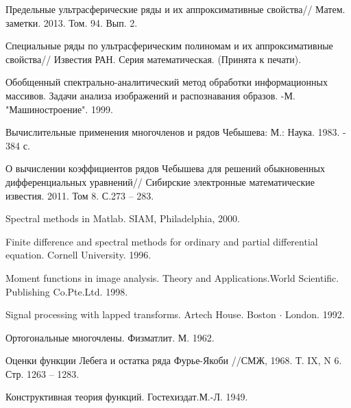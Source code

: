 \begin{thebibliography}{1} %




Предельные ультрасферические ряды и их аппроксимативные свойства// Матем. заметки. 2013. Том. 94. Вып. 2.

Специальные  ряды по ультрасферическим полиномам и их аппроксимативные свойства// Известия РАН. Серия математическая. (Принята к печати).

Обобщенный спектрально-аналитический метод обработки информационных массивов. Задачи анализа изображений и распознавания образов. -М. "Машиностроение". 1999.

Вычислительные применения многочленов и рядов Чебышева:  М.: Наука. 1983. - 384 с.

О вычислении коэффициентов рядов Чебышева для решений обыкновенных дифференциальных уравнений// Сибирские электронные  математические известия. 2011. Том 8. С.273 -- 283.

Spectral methods in Matlab. SIAM, Philadelphia, 2000.

Finite difference and spectral methods for ordinary and partial differential equation. Cornell University. 1996.

Moment functions in image analysis. Theory and Applications.World Scientific. Publishing Co.Pte.Ltd. 1998.

Signal processing with lapped transforms. Artech House. Boston{ $\cdot$} London. 1992.

Ортогональные многочлены.  Физматлит. М. 1962.

Оценки функции Лебега и остатка ряда Фурье-Якоби //СМЖ, 1968. Т. IX, N 6. Стр. 1263 -- 1283.

Конструктивная теория функций. Гостехиздат.М.-Л. 1949.


\end{thebibliography}
